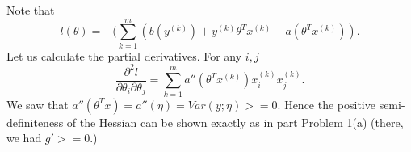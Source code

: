 \begin{answer}
Note that
$$l(\theta) = - (\sum\limits_{k = 1}^{m }(b(y^{(k)})  + y^{(k)}\theta^T x^{(k)} - a(\theta^Tx^{(k)})).$$
Let us calculate the partial derivatives. For any $i, j$
$$\frac{\partial^2 l}{\partial \theta_i\partial \theta_j} =
\sum\limits_{k = 1}^{m }a''(\theta^T x^{(k)})x_i^{(k)}x_j^{(k)}. $$
We saw that $a''(\theta^Tx) = a''(\eta) = Var(y;\eta) >=0.$
Hence the positive semi-definiteness of the Hessian can be shown exactly as in part Problem 1(a) (there, we had $g' >= 0.$)

\end{answer}
